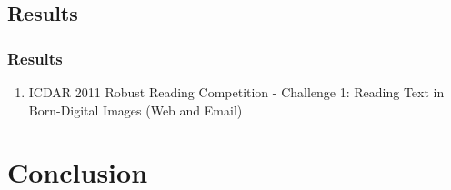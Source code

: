 \documentclass[9pt]{beamer}
\begin{document}
\subsection[Results]{Results}
	\begin{frame}
		\frametitle{Results}
		\begin{center}	
		  \vspace{1em}
		\end{center}
		\begin{block}{}
					\begin{enumerate}
						\item ICDAR 2011 Robust Reading Competition - Challenge 1: Reading Text in Born-Digital Images (Web and Email)\footnotemark[1]
					\end{enumerate}					
				\end{block}
		

	\end{frame}	
	

\section[Conclusion]{Conclusion}
\end{document}
